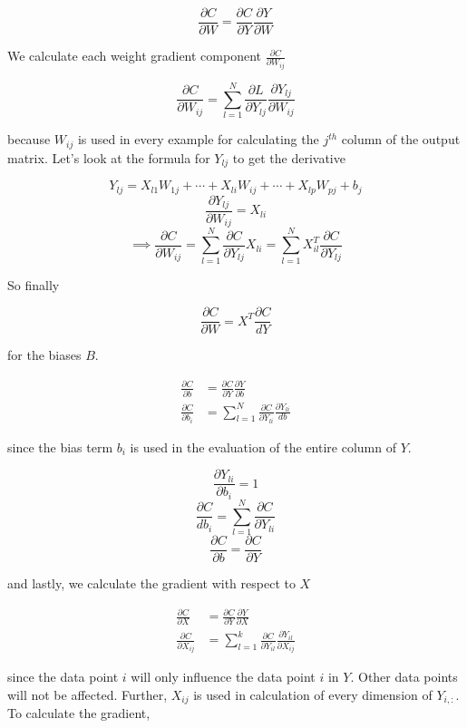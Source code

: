 \documentclass[a4paper, twocolumn, twoside]{article}
\begin{document}
	$$
    \frac{\partial C}{\partial W} = \frac{\partial C}{\partial Y} \frac{\partial Y}{\partial W}
	$$

	We calculate each weight gradient component $\frac{\partial C }{\partial W_{ij}}$

	$$
    \frac{\partial C}{\partial W_{ij}} = \sum_{l=1}^{N} \frac{\partial L}{\partial Y_{lj}} \frac{\partial Y_{lj}}{\partial W_{ij}}
	$$

	because $W_{ij}$ is used in every example for calculating the $j^{th}$ column of the output matrix. Let's look at the formula for $Y_{lj}$ to get the derivative

	$$
		Y_{lj} = X_{l1}W_{1j} + \cdots + X_{li}W_{ij} + \cdots + X_{lp}W_{pj} + b_{j}
	$$
	$$
		\frac{\partial Y_{lj}}{\partial W_{ij}} = X_{li}
	$$
	$$
		\implies \frac{\partial C}{\partial W_{ij}} = \sum_{l=1}^{N} \frac{\partial C}{\partial Y_{lj}} X_{li} = \sum_{l=1}^{N} X^{T}_{il}\frac{\partial C}{\partial Y_{lj}}
	$$

	So finally 

	$$
		\frac{\partial C}{\partial W} = X^{T} \frac{\partial C}{dY}
	$$

	for the biases $B$.

	\begin{align}
		\frac{\partial C}{\partial b} &= \frac{\partial C}{\partial Y} \frac{\partial Y}{\partial b}\\
		\frac{\partial C}{\partial b_{i}} &= \sum_{l=1}^{N} \frac{\partial C}{\partial Y_{li}} \frac{\partial Y_{li}}{db}
	\end{align}

	since the bias term $b_{i}$ is used in the evaluation of the entire column of $Y$.

	$$
		\frac{\partial Y_{li}}{\partial b_{i}} = 1
	$$
	$$
		\frac{\partial C}{db_{i}} = \sum_{l=1}^{N} \frac{\partial C}{\partial Y_{li}}
	$$
	$$
		\frac{\partial C}{\partial b} = \frac{\partial C}{\partial Y}
	$$

	and lastly, we calculate the gradient with respect to $X$

	\begin{align}
		\frac{\partial C}{\partial X} &= \frac{\partial C}{\partial Y} \frac{\partial Y}{\partial X}\\
		\frac{\partial C}{\partial X_{ij}} &= \sum_{l=1}^{k} \frac{\partial C}{\partial Y_{il}} \frac{\partial Y_{il}}{\partial X_{ij}}
	\end{align}

	since the data point $i$ will only influence the data point $i$ in $Y$. Other data points will not be affected. Further, $X_{ij}$ is used in calculation of every dimension of $Y_{i,:}$. To calculate the gradient,
\end{document}

